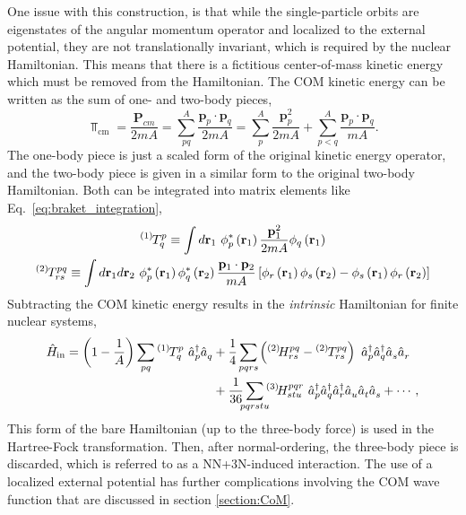 \documentclass[thesis.tex]{subfiles}
\begin{document}
One issue with this construction, is that while the single-particle orbits are eigenstates of the angular momentum operator and localized to the external potential, they are not translationally invariant, which is required by the nuclear Hamiltonian.  This means that there is a fictitious center-of-mass kinetic energy which must be removed from the Hamiltonian.  The COM kinetic energy can be written as the sum of one- and two-body pieces,
\begin{equation}
  \Top_{\mathrm{cm}} = \frac{\mathbf{P}_{cm}}{2mA} = \sum^{A}_{pq}\frac{\mathbf{p}_{p}\cdot\mathbf{p}_{q}}{2mA} = \sum^{A}_{p}\frac{\mathbf{p}^{2}_{p}}{2mA} + \sum^{A}_{p<q}\frac{\mathbf{p}_{p}\cdot\mathbf{p}_{q}}{mA}.
\end{equation}
The one-body piece is just a scaled form of the original kinetic energy operator, and the two-body piece is given in a similar form to the original two-body Hamiltonian.  Both can be integrated into matrix elements like Eq.\ \eqref{eq:braket_integration},
\begin{gather} \label{eq:ke_integration}
    {}^{\left(1\right)}\hspace{-1pt}T^{p}_{q} \equiv \int d\mathbf{r}_{1}\  \phi^{*}_{p}\left(\mathbf{r}_{1}\right) \frac{\mathbf{p}^{2}_{1}}{2mA} \phi_{q}\left(\mathbf{r}_{1}\right) \notag \\
    {}^{\left(2\right)}\hspace{-1pt}T^{pq}_{rs} \equiv \int d\mathbf{r}_{1} d\mathbf{r}_{2}\  \phi^{*}_{p}\left(\mathbf{r}_{1}\right)\phi^{*}_{q}\left(\mathbf{r}_{2}\right) \frac{\mathbf{p}_{1}\cdot\mathbf{p}_{2}}{mA} \left[\phi_{r}\left(\mathbf{r}_{1}\right)\phi_{s}\left(\mathbf{r}_{2}\right) - \phi_{s}\left(\mathbf{r}_{1}\right)\phi_{r}\left(\mathbf{r}_{2}\right)\right]
\end{gather}
Subtracting the COM kinetic energy results in the \textit{intrinsic} Hamiltonian for finite nuclear systems,
\begin{align} \label{eq:intrinsic_hamiltonian}
  \Ham_{\mathrm{in}} = \left(1 - \frac{1}{A}\right)\sum_{\mathclap{pq}}\KEint{1}{p}{q}\ \co{p}\ao{q} &+ \frac{1}{4}\sum_{\mathclap{pqrs}}\left(\Hint{2}{pq}{rs} - \KEint{2}{pq}{rs}\right)\ \co{p}\co{q}\ao{s}\ao{r} \notag \\
  &+ \frac{1}{36}\sum_{\mathclap{pqrstu}}\Hint{3}{pqr}{stu}\ \co{p}\co{q}\co{r}\ao{u}\ao{t}\ao{s} + \cdots,
\end{align}
This form of the bare Hamiltonian (up to the three-body force) is used in the Hartree-Fock transformation.  Then, after normal-ordering, the three-body piece is discarded, which is referred to as a NN+3N-induced interaction.  The use of a localized external potential has further complications involving the COM wave function that are discussed in section \ref{section:CoM}.
\end{document}
